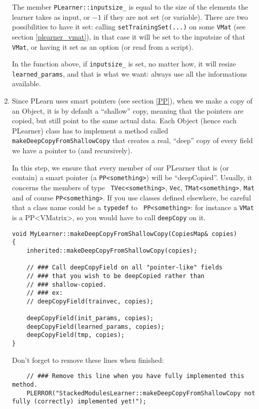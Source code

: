 \documentclass[11pt]{book}
\begin{document}
\begin{enumerate}
The member {\tt PLearner::inputsize\_} is equal to the size of the
elements the learner takes as input, or $-1$ if they are not
set (or variable). There are two possibilities to have it set:
calling {\tt setTrainingSet(...)} on some {\tt VMat} (see section
\ref{plearner_vmat}), in that case it will be set to the inputsize of
that {\tt VMat}, or having it set as an option (or read from a script).

In the function above, if {\tt inputsize\_} is set, no matter how, it
will resize {\tt learned\_params}, and that is what we want: always use
all the informations available.

\item Since PLearn uses smart pointers (see section \ref{PP}), when
we make a copy of an Object, it is by default a ``shallow'' copy,
meaning that the pointers are copied, but still point to the same actual
data. Each Object (hence each PLearner) class has to implement a method
called {\tt makeDeepCopyFromShallowCopy} that creates a real, ``deep''
copy of every field we have a pointer to (and recursively).

In this step, we ensure that every member of our PLearner that
is (or contain) a smart pointer (a {\tt PP<something>}) will be
``deepCopied''. Usually, it concerns the members of type {\tt
TVec<something>}, {\tt Vec}, {\tt TMat<something>}, {\tt Mat} and of
course {\tt PP<something>}. If you use classes defined elsewhere,
be careful that a class name could be a {\tt typedef} to {\tt
PP<something>}: for instance a {\tt VMat} is a {PP<VMatrix>}, so you
would have to call {\tt deepCopy} on it.

\begin{verbatim}
void MyLearner::makeDeepCopyFromShallowCopy(CopiesMap& copies)
{
    inherited::makeDeepCopyFromShallowCopy(copies);

    // ### Call deepCopyField on all "pointer-like" fields
    // ### that you wish to be deepCopied rather than
    // ### shallow-copied.
    // ### ex:
    // deepCopyField(trainvec, copies);

    deepCopyField(init_params, copies);
    deepCopyField(learned_params, copies);
    deepCopyField(tmp, copies);
}
\end{verbatim}
Don't forget to remove these lines when finished:
\begin{verbatim}
    // ### Remove this line when you have fully implemented this method.
    PLERROR("StackedModulesLearner::makeDeepCopyFromShallowCopy not fully (correctly) implemented yet!");
\end{verbatim}


\end{enumerate}
\end{document}
